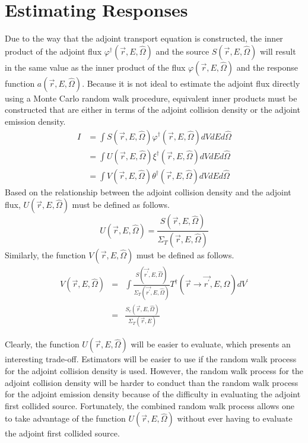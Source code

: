 \section{Estimating Responses}
Due to the way that the adjoint transport equation is constructed, the inner
product of the adjoint flux $\varphi^{\dagger}(\vec{r},E,\hat{\Omega})$ and the
source $S(\vec{r},E,\hat{\Omega})$ will result in the same value as the inner 
product of the flux $\varphi(\vec{r},E,\hat{\Omega})$ and the response
function $a(\vec{r},E,\hat{\Omega})$. Because it is not ideal to estimate the
adjoint flux directly using a Monte Carlo random walk procedure, equivalent
inner products must be constructed that are either in terms of the adjoint
collision density or the adjoint emission density.
\begin{align}
  I & = \int S(\vec{r},E,\hat{\Omega})\varphi^{\dagger}(\vec{r},E,\hat{\Omega})
  dV dE d\hat{\Omega} \\ 
  & = \int U(\vec{r},E,\hat{\Omega})\xi^{\dagger}(\vec{r},E,\hat{\Omega})
  dV dE d\hat{\Omega} \\
  & = \int V(\vec{r},E,\hat{\Omega})\theta^{\dagger}(\vec{r},E,\hat{\Omega})
  dV dE d\hat{\Omega}
  \label{eq:adj_emission_ip}
\end{align}
Based on the relationship between the adjoint collision density and the
adjoint flux, $U(\vec{r},E,\hat{\Omega})$ must be defined as follows.
\begin{equation}
  U(\vec{r},E,\hat{\Omega}) = \frac{S(\vec{r},E,\hat{\Omega})}
                                   {\Sigma_T(\vec{r},E,\hat{\Omega})}
\end{equation}
Similarly, the function $V(\vec{r},E,\hat{\Omega})$ must be defined as follows.
\begin{eqnarray}
  V(\vec{r},E,\hat{\Omega}) & = & \int \frac{S(\vec{r^{'}},E,\hat{\Omega})}
  {\Sigma_T(\vec{r^{'}},E,\hat{\Omega})} 
  T^{\dagger}(\vec{r} \to \vec{r^{'}},E,\hat{\Omega}) dV^{'} \\
  & = & \frac{S_c(\vec{r},E,\hat{\Omega})}{\Sigma_T(\vec{r},E)} \nonumber
\end{eqnarray}

Clearly, the function $U(\vec{r},E,\hat{\Omega})$ will be easier to evaluate,
which presents an interesting trade-off. Estimators will be easier to use if
the random walk process for the adjoint collision density is used. However, 
the random walk process for the adjoint collision density will be harder to 
conduct than the random walk process for the adjoint emission density because
of the difficulty in evaluating the adjoint first collided source. Fortunately,
the combined random walk process allows one to take advantage of the function
$U(\vec{r},E,\hat{\Omega})$ without ever having to evaluate the adjoint first 
collided source. 

